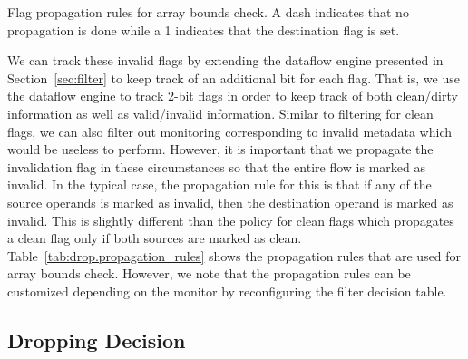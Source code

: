 \begin{table}[tb]
  \begin{center}
    \begin{small}
    
    \end{small}
    \caption{Flag propagation rules for array bounds check. A dash indicates that no
    propagation is done while a 1 indicates that the destination flag is set.}
    \label{tab:drop.propagation_rules}
    \vspace{-0.2in}
  \end{center}
\end{table}

We can track these invalid flags by extending the dataflow engine presented in
Section~\ref{sec:filter} to keep track of an additional bit for each flag. That
is, we use the dataflow engine to track 2-bit flags in order to keep track of
both clean/dirty information as well as valid/invalid information.
Similar to filtering for clean flags, we can also filter out
monitoring corresponding to invalid metadata which would be useless to perform.
However, it is important that we propagate the
invalidation flag in these circumstances so that the entire flow is marked as invalid. 
In the typical case, the propagation rule for this is
that if any of the source operands is marked as invalid, then the destination
operand is marked as invalid. This is slightly different than the
policy for clean flags which propagates a clean flag only if both
sources are marked as clean. Table~\ref{tab:drop.propagation_rules} shows the
propagation rules that are used for array bounds check. However, we note that
the propagation rules can be customized depending on the monitor by
reconfiguring the filter decision table.

\subsection{Dropping Decision}
\label{sec:drop.policies}

